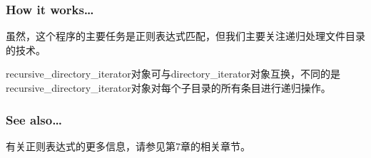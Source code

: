 \subsubsection{How it works…}

虽然，这个程序的主要任务是正则表达式匹配，但我们主要关注递归处理文件目录的技术。

recursive\_directory\_iterator对象可与directory\_iterator对象互换，不同的是recursive\_directory\_iterator对象对每个子目录的所有条目进行递归操作。

\subsubsection{See also…}

有关正则表达式的更多信息，请参见第7章的相关章节。












